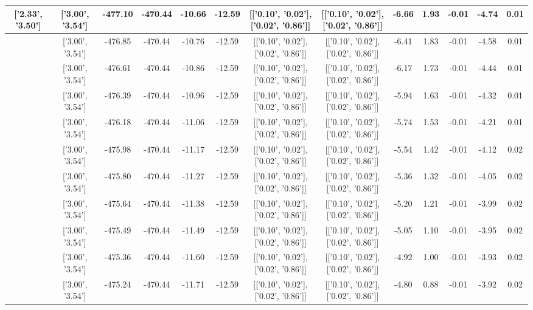 \begin{table}[htbp]
\begin{adjustbox}{angle=90}
\begin{tabular}{|c|c|c|c|c|c|c|c|c|c|c|c|c|}
 ['2.33', '3.50'] & ['3.00', '3.54'] & -477.10 & -470.44 & -10.66 & -12.59 & [['0.10', '0.02'], ['0.02', '0.86']] & [['0.10', '0.02'], ['0.02', '0.86']] & -6.66 & 1.93 & -0.01 & -4.74 & 0.01\\ \hline
 ['2.37', '3.50'] & ['3.00', '3.54'] & -476.85 & -470.44 & -10.76 & -12.59 & [['0.10', '0.02'], ['0.02', '0.86']] & [['0.10', '0.02'], ['0.02', '0.86']] & -6.41 & 1.83 & -0.01 & -4.58 & 0.01\\ \hline
 ['2.41', '3.50'] & ['3.00', '3.54'] & -476.61 & -470.44 & -10.86 & -12.59 & [['0.10', '0.02'], ['0.02', '0.86']] & [['0.10', '0.02'], ['0.02', '0.86']] & -6.17 & 1.73 & -0.01 & -4.44 & 0.01\\ \hline
 ['2.44', '3.50'] & ['3.00', '3.54'] & -476.39 & -470.44 & -10.96 & -12.59 & [['0.10', '0.02'], ['0.02', '0.86']] & [['0.10', '0.02'], ['0.02', '0.86']] & -5.94 & 1.63 & -0.01 & -4.32 & 0.01\\ \hline
 ['2.48', '3.51'] & ['3.00', '3.54'] & -476.18 & -470.44 & -11.06 & -12.59 & [['0.10', '0.02'], ['0.02', '0.86']] & [['0.10', '0.02'], ['0.02', '0.86']] & -5.74 & 1.53 & -0.01 & -4.21 & 0.01\\ \hline
 ['2.52', '3.51'] & ['3.00', '3.54'] & -475.98 & -470.44 & -11.17 & -12.59 & [['0.10', '0.02'], ['0.02', '0.86']] & [['0.10', '0.02'], ['0.02', '0.86']] & -5.54 & 1.42 & -0.01 & -4.12 & 0.02\\ \hline
 ['2.56', '3.51'] & ['3.00', '3.54'] & -475.80 & -470.44 & -11.27 & -12.59 & [['0.10', '0.02'], ['0.02', '0.86']] & [['0.10', '0.02'], ['0.02', '0.86']] & -5.36 & 1.32 & -0.01 & -4.05 & 0.02\\ \hline
 ['2.60', '3.51'] & ['3.00', '3.54'] & -475.64 & -470.44 & -11.38 & -12.59 & [['0.10', '0.02'], ['0.02', '0.86']] & [['0.10', '0.02'], ['0.02', '0.86']] & -5.20 & 1.21 & -0.01 & -3.99 & 0.02\\ \hline
 ['2.63', '3.52'] & ['3.00', '3.54'] & -475.49 & -470.44 & -11.49 & -12.59 & [['0.10', '0.02'], ['0.02', '0.86']] & [['0.10', '0.02'], ['0.02', '0.86']] & -5.05 & 1.10 & -0.01 & -3.95 & 0.02\\ \hline
 ['2.67', '3.52'] & ['3.00', '3.54'] & -475.36 & -470.44 & -11.60 & -12.59 & [['0.10', '0.02'], ['0.02', '0.86']] & [['0.10', '0.02'], ['0.02', '0.86']] & -4.92 & 1.00 & -0.01 & -3.93 & 0.02\\ \hline
 ['2.71', '3.52'] & ['3.00', '3.54'] & -475.24 & -470.44 & -11.71 & -12.59 & [['0.10', '0.02'], ['0.02', '0.86']] & [['0.10', '0.02'], ['0.02', '0.86']] & -4.80 & 0.88 & -0.01 & -3.92 & 0.02\\ \hline

\end{tabular}
\end{adjustbox}
\end{table}
